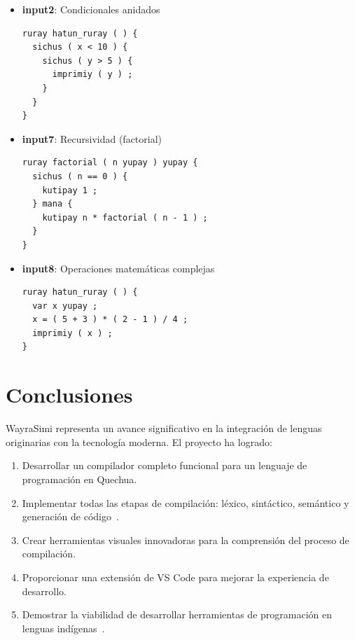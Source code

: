 \documentclass[conference]{IEEEtran}
\begin{document}
\begin{itemize}
\item \textbf{input2}: Condicionales anidados

\begin{lstlisting}[language=BNF, style=mystyle]
ruray hatun_ruray ( ) {
  sichus ( x < 10 ) {
    sichus ( y > 5 ) {
      imprimiy ( y ) ;
    }
  }
}
\end{lstlisting}

\item \textbf{input7}: Recursividad (factorial)

\begin{lstlisting}[language=BNF, style=mystyle]
ruray factorial ( n yupay ) yupay {
  sichus ( n == 0 ) {
    kutipay 1 ;
  } mana {
    kutipay n * factorial ( n - 1 ) ;
  }
}
\end{lstlisting}

\item \textbf{input8}: Operaciones matemáticas complejas

\begin{lstlisting}[language=BNF, style=mystyle]
ruray hatun_ruray ( ) {
  var x yupay ;
  x = ( 5 + 3 ) * ( 2 - 1 ) / 4 ;
  imprimiy ( x ) ;
}
\end{lstlisting}

\end{itemize}

\section{Conclusiones}

WayraSimi representa un avance significativo en la integración de lenguas originarias con la tecnología moderna. El proyecto ha logrado:

\begin{enumerate}
\item Desarrollar un compilador completo funcional para un lenguaje de programación en Quechua.
\item Implementar todas las etapas de compilación: léxico, sintáctico, semántico y generación de código~\cite{b1}.
\item Crear herramientas visuales innovadoras para la comprensión del proceso de compilación.
\item Proporcionar una extensión de VS Code para mejorar la experiencia de desarrollo.
\item Demostrar la viabilidad de desarrollar herramientas de programación en lenguas indígenas~\cite{b3}.
\end{enumerate}
\end{document}
